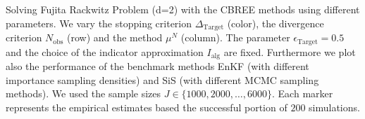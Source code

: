 Solving Fujita Rackwitz Problem (d=2) with the CBREE methods using      different parameters.     We vary the stopping criterion $\Delta_{\text{Target}}$ (color),     the divergence criterion $N_\text{obs}$ (row) and     the method $\mu^N$ (column).     The parameter $\epsilon_{\text{Target}} = 0.5$     and the choice of the indicator approximation $I_\text{alg}$     are fixed.     Furthermore we plot also the performance of the benchmark methods EnKF    (with different importance sampling densities)    and SiS (with different MCMC sampling methods).     We used the sample sizes $J \in \{1000, 2000, \ldots, 6000\}$.     Each marker represents the empirical estimates based the successful portion of $200$ simulations.